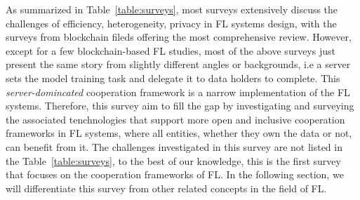 As summarized in Table~\ref{table:surveys}, most surveys extensively discuss the challenges of efficiency, heterogeneity, privacy in FL systems design, with the surveys from blockchain fileds offering the most comprehensive review.
However, except for a few blockchain-based FL studies, most of the above surveys just present the same story from slightly different angles or backgrounds, i.e a server sets the model training task and delegate it to data holders to complete. 
This \textit{server-domincated} cooperation framework is a narrow implementation of the FL systems.
Therefore, this survey aim to fill the gap by investigating and surveying the associated tenchnologies that support more open and inclusive cooperation frameworks in FL systems, where all entities, whether they own the data or not, can benefit from it. 
The challenges investigated in this survey are not listed in the Table~\ref{table:surveys}, to the best of our knowledge, this is the first survey that focuses on the cooperation frameworks of FL.
In the following section, we will differentiate this survey from other related concepts in the field of FL.

